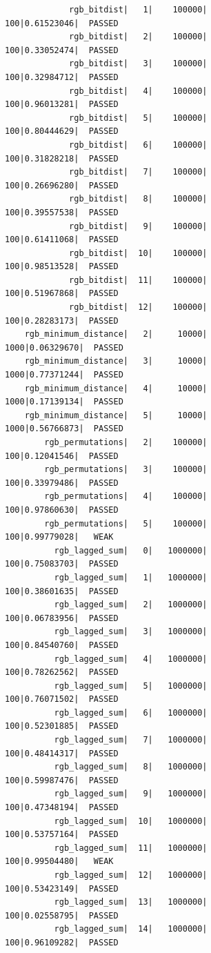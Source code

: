 \documentclass[11pt, a4paper, titlepage]{article}
\begin{document}
\begin{figure}[H]
    \fontsize{8pt}{10pt}\selectfont
    \centering
    \begin{verbatim}
             rgb_bitdist|   1|    100000|     100|0.61523046|  PASSED
             rgb_bitdist|   2|    100000|     100|0.33052474|  PASSED
             rgb_bitdist|   3|    100000|     100|0.32984712|  PASSED
             rgb_bitdist|   4|    100000|     100|0.96013281|  PASSED
             rgb_bitdist|   5|    100000|     100|0.80444629|  PASSED
             rgb_bitdist|   6|    100000|     100|0.31828218|  PASSED
             rgb_bitdist|   7|    100000|     100|0.26696280|  PASSED
             rgb_bitdist|   8|    100000|     100|0.39557538|  PASSED
             rgb_bitdist|   9|    100000|     100|0.61411068|  PASSED
             rgb_bitdist|  10|    100000|     100|0.98513528|  PASSED
             rgb_bitdist|  11|    100000|     100|0.51967868|  PASSED
             rgb_bitdist|  12|    100000|     100|0.28283173|  PASSED
    rgb_minimum_distance|   2|     10000|    1000|0.06329670|  PASSED
    rgb_minimum_distance|   3|     10000|    1000|0.77371244|  PASSED
    rgb_minimum_distance|   4|     10000|    1000|0.17139134|  PASSED
    rgb_minimum_distance|   5|     10000|    1000|0.56766873|  PASSED
        rgb_permutations|   2|    100000|     100|0.12041546|  PASSED
        rgb_permutations|   3|    100000|     100|0.33979486|  PASSED
        rgb_permutations|   4|    100000|     100|0.97860630|  PASSED
        rgb_permutations|   5|    100000|     100|0.99779028|   WEAK
          rgb_lagged_sum|   0|   1000000|     100|0.75083703|  PASSED
          rgb_lagged_sum|   1|   1000000|     100|0.38601635|  PASSED
          rgb_lagged_sum|   2|   1000000|     100|0.06783956|  PASSED
          rgb_lagged_sum|   3|   1000000|     100|0.84540760|  PASSED
          rgb_lagged_sum|   4|   1000000|     100|0.78262562|  PASSED
          rgb_lagged_sum|   5|   1000000|     100|0.76071502|  PASSED
          rgb_lagged_sum|   6|   1000000|     100|0.52301885|  PASSED
          rgb_lagged_sum|   7|   1000000|     100|0.48414317|  PASSED
          rgb_lagged_sum|   8|   1000000|     100|0.59987476|  PASSED
          rgb_lagged_sum|   9|   1000000|     100|0.47348194|  PASSED
          rgb_lagged_sum|  10|   1000000|     100|0.53757164|  PASSED
          rgb_lagged_sum|  11|   1000000|     100|0.99504480|   WEAK
          rgb_lagged_sum|  12|   1000000|     100|0.53423149|  PASSED
          rgb_lagged_sum|  13|   1000000|     100|0.02558795|  PASSED
          rgb_lagged_sum|  14|   1000000|     100|0.96109282|  PASSED

\end{verbatim}
\end{figure}
\end{document}
